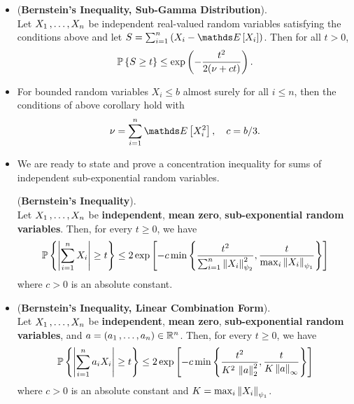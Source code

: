 \documentclass[11pt]{article}
\begin{document}
\begin{itemize}
\item \begin{corollary}(\textbf{Bernstein's Inequality, Sub-Gamma Distribution}).  \citep{boucheron2013concentration}\\
Let $X_1 \,{,}\ldots{,}\, X_n$ be independent real-valued random variables satisfying the conditions above and let $S = \sum_{i=1}^{n}\paren{X_i - \E{}{X_i}}$. Then for all $t > 0$,
\begin{align}
{\mathbb P}\left\{S \ge t \right\} \le \exp\left(- \frac{t^2}{2(\nu + ct)}\right).  \label{ineqn: bernstein_inequality_gammar_dist}
\end{align}
\end{corollary}

\item \begin{remark}
For bounded random variables $X_i \le b$ almost surely for all $i \le n$, then the conditions of above corollary hold with
\begin{align*}
\nu = \sum_{i=1}^{n}\E{}{X_i^2}, \quad c = b/3.
\end{align*}
\end{remark}


\item We are ready to state and prove a concentration inequality for sums of independent sub-exponential random variables.
\begin{proposition} (\textbf{Bernstein's Inequality}).  \citep{vershynin2018high}\\
Let $X_1 \,{,}\ldots{,}\, X_n$ be \textbf{independent}, \textbf{mean zero}, \textbf{sub-exponential random variables}. Then, for every $t \ge 0$, we have
\begin{align}
{\mathbb P}\left\{\left\lvert \sum_{i=1}^{n}X_i \right\rvert \ge t\right\} \le 2 \exp\left[- c \min\left\{\frac{t^2}{\sum_{i=1}^{n}\left\|X_i\right\|_{\psi_2}^2},  \frac{t}{\max_i \left\|X_i\right\|_{\psi_1}}\right\}\right] \label{ineqn: bernstein_inequality}
\end{align}
where $c > 0$ is an absolute constant.
\end{proposition}

\item 
\begin{proposition} (\textbf{Bernstein's Inequality, Linear Combination Form}).  \citep{vershynin2018high}\\
Let $X_1 \,{,}\ldots{,}\, X_n$ be \textbf{independent}, \textbf{mean zero}, \textbf{sub-exponential random variables}, and $a = (a_1 \,{,}\ldots{,}\, a_n) \in {\mathbb R}^n$. Then, for every $t \ge 0$, we have
\begin{align}
{\mathbb P}\left\{\left\lvert \sum_{i=1}^{n}a_i X_i \right\rvert \ge t\right\} \le 2 \exp\left[- c \min\left\{\frac{t^2}{K^2\, \left\|a\right\|_{2}^2},  \frac{t}{K \left\|a\right\|_{\infty}}\right\}\right] \label{ineqn: bernstein_inequality_linear_comb}
\end{align}
where $c > 0$ is an absolute constant and $K = \max_i \left\|X_i\right\|_{\psi_1}$.
\end{proposition}


\end{itemize}
\end{document}
